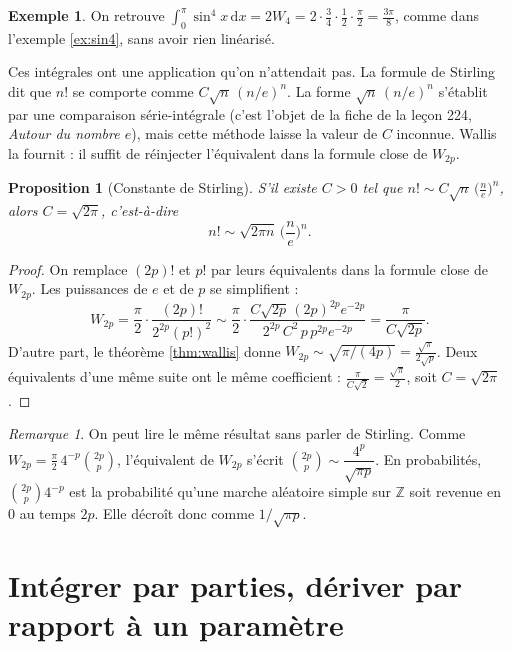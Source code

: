\documentclass[11pt,a4paper]{article}
\theoremstyle{plain}
\newtheorem{proposition}[theoreme]{Proposition}
\theoremstyle{definition}
\newtheorem{exemple}[theoreme]{Exemple}
\theoremstyle{remark}
\newtheorem{remarque}[theoreme]{Remarque}
\newcommand{\Z}{\mathbb{Z}}
\newcommand{\dd}{\,\mathrm{d}}
\begin{document}
\begin{exemple}
On retrouve $\int_0^\pi\sin^4x\dd x=2W_4=2\cdot\frac34\cdot\frac12\cdot\frac\pi2=\frac{3\pi}8$, comme dans l'exemple \ref{ex:sin4}, sans avoir rien linéarisé.
\end{exemple}

Ces intégrales ont une application qu'on n'attendait pas. La formule de Stirling dit que $n!$ se comporte comme $C\sqrt n\,(n/e)^n$. La forme $\sqrt n\,(n/e)^n$ s'établit par une comparaison série-intégrale (c'est l'objet de la fiche de la leçon 224, \emph{Autour du nombre $e$}), mais cette méthode laisse la valeur de $C$ inconnue. Wallis la fournit : il suffit de réinjecter l'équivalent dans la formule close de $W_{2p}$.

\begin{proposition}[Constante de Stirling]\label{prop:stirling}
S'il existe $C>0$ tel que $n!\sim C\sqrt{n}\,\big(\frac ne\big)^n$, alors $C=\sqrt{2\pi}$, c'est-à-dire
\[
  n!\sim\sqrt{2\pi n}\,\Big(\frac ne\Big)^n .
\]
\end{proposition}

\begin{proof}
On remplace $(2p)!$ et $p!$ par leurs équivalents dans la formule close de $W_{2p}$. Les puissances de $e$ et de $p$ se simplifient :
\[
  W_{2p}=\frac\pi2\cdot\frac{(2p)!}{2^{2p}(p!)^2}
  \sim\frac\pi2\cdot\frac{C\sqrt{2p}\,(2p)^{2p}e^{-2p}}{2^{2p}\,C^2\,p\,p^{2p}e^{-2p}}
  =\frac{\pi}{C\sqrt{2p}} .
\]
D'autre part, le théorème \ref{thm:wallis} donne $W_{2p}\sim\sqrt{\pi/(4p)}=\frac{\sqrt\pi}{2\sqrt p}$. Deux équivalents d'une même suite ont le même coefficient : $\frac{\pi}{C\sqrt2}=\frac{\sqrt\pi}2$, soit $C=\sqrt{2\pi}$.
\end{proof}

\begin{remarque}
On peut lire le même résultat sans parler de Stirling. Comme $W_{2p}=\frac\pi2\,4^{-p}\binom{2p}p$, l'équivalent de $W_{2p}$ s'écrit $\binom{2p}{p}\sim\dfrac{4^p}{\sqrt{\pi p}}$. En probabilités, $\binom{2p}{p}4^{-p}$ est la probabilité qu'une marche aléatoire simple sur $\Z$ soit revenue en $0$ au temps $2p$. Elle décroît donc comme $1/\sqrt{\pi p}$.
\end{remarque}

\section{Intégrer par parties, dériver par rapport à un paramètre}
\end{document}
